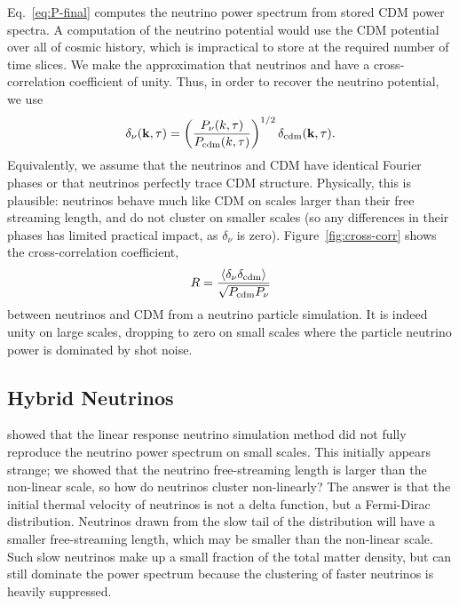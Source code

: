 \documentclass[useAMS, usenatbib]{mnras}
\newcommand{\bs}{\mathbf}
\begin{document}
Eq.~\ref{eq:P-final} computes the neutrino power spectrum from stored CDM power spectra.
A computation of the neutrino potential would use the CDM potential over all of cosmic history, which is impractical
to store at the required number of time slices. We make the approximation that neutrinos and
have a cross-correlation coefficient of unity. Thus, in order to recover the neutrino potential, we use
\begin{equation}
\delta_{\nu}(\bs k, \tau) = \left(\frac{P_{\nu}(k,
    \tau)}{P_{\rm cdm}(k, \tau)}\right)^{1/2} \delta_{\rm cdm}(\bs k, \tau).\label{eq:phases}
\end{equation}
Equivalently, we assume that the neutrinos and CDM have identical Fourier phases or that neutrinos perfectly trace CDM structure.
Physically, this is plausible: neutrinos behave much like CDM on scales larger than their free streaming length,
and do not cluster on smaller scales (so any differences in their phases has limited practical impact, as $\delta_\nu$ is zero).
Figure~\ref{fig:cross-corr} shows the cross-correlation coefficient,
\begin{equation}
R = \frac{\left\langle \delta_\nu \delta_\mathrm{cdm} \right\rangle}{\sqrt{P_{\rm{cdm}} P_{\rm{\nu}}}}
\end{equation}
between neutrinos and CDM from a neutrino particle simulation. It is indeed unity on large scales,
dropping to zero on small scales where the particle neutrino power is dominated by shot noise.

\subsection{Hybrid Neutrinos}
\label{sec:hybrid}

\cite{AHB} showed that the linear response neutrino simulation method did not fully reproduce the neutrino power spectrum on small scales. This initially appears strange; we showed that the neutrino free-streaming length is larger than the non-linear scale, so how do neutrinos cluster non-linearly? The answer is that the initial thermal velocity of neutrinos is not a delta function, but a Fermi-Dirac distribution. Neutrinos drawn from the slow tail of the distribution will have a smaller free-streaming length, which may be smaller than the non-linear scale. Such slow neutrinos make up a small fraction of the total matter density, but can still dominate the power spectrum because the clustering of faster neutrinos is heavily suppressed.
\end{document}

